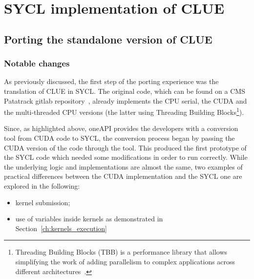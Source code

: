 \chapter{SYCL implementation of CLUE}
\label{ch:3}
\section{Porting the standalone version of CLUE}
\subsection{Notable changes}
As previously discussed, the first step of the porting experience was the translation of CLUE in SYCL. The original code, which can be found on a CMS Patatrack gitlab repository~\cite{clue_repo}, already implements the CPU serial, the CUDA and the multi-threaded CPU versions (the latter using Threading Building Blocks\footnote{Threading Building Blocks (TBB) is a performance library that allows simplifying the work of adding parallelism to complex applications across different architectures~\cite{TBB}.}). 

Since, as highlighted above, oneAPI provides the developers with a conversion tool from CUDA code to SYCL, the conversion process began by passing the CUDA version of the code through the tool. This produced the first prototype of the SYCL code which needed some modifications in order to run correctly. While the underlying logic and implementations are almost the same, two examples of practical differences between the CUDA implementation and the SYCL one are explored in the following: 
\begin{itemize}
    \item kernel submission;
    \item use of variables inside kernels as demonstrated in Section~\ref{ch:kernels_execution}
\end{itemize}
